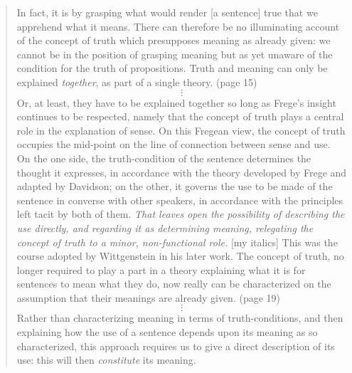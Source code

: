 \begin{quote}
In fact, it is by grasping what would render [a sentence] true that we apprehend what it means. There can therefore be no illuminating account of the concept of truth which presupposes meaning as already given: we cannot be in the position of grasping meaning but as yet unaware of the condition for the truth of propositions. Truth and meaning can only be explained \emph{together}, as part of a single theory. (page 15)
\[\vdots\]
Or, at least, they have to be explained together so long as Frege's insight continues to be respected, namely that the concept of truth plays a central role in the explanation of sense. On this Fregean view, the concept of truth occupies the mid-point on the line of connection between sense and use. On the one side, the truth-condition of the sentence determines the thought it expresses, in accordance with the theory developed by Frege and adapted by Davidson; on the other, it governs the use to be made of the sentence in converse with other speakers, in accordance with the principles left tacit by both of them. \emph{That leaves open the possibility of describing the use directly, and regarding it as determining meaning, relegating the concept of truth to a minor, non-functional role.} [my italics] This was the course adopted by Wittgenstein in his later work. The concept of truth, no longer required to play a part in a theory explaining what it is for sentences to mean what they do, now really can be characterized on the assumption that their meanings are already given. (page 19)
\[\vdots\]
Rather than characterizing meaning in terms of truth-conditions, and then explaining how the use of a sentence depends upon its meaning as so characterized, this approach requires us to give a direct description of its use: this will then \emph{constitute} its meaning.


\end{quote}
